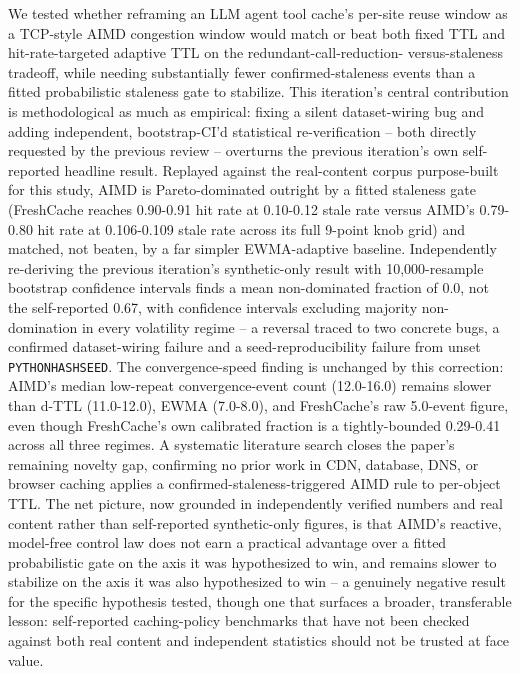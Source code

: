 \documentclass[11pt,letterpaper]{article}
\begin{document}
We tested whether reframing an LLM agent tool cache's per-site reuse window as a TCP-style AIMD congestion
window would match or beat both fixed TTL and hit-rate-targeted adaptive TTL on the redundant-call-reduction-
versus-staleness tradeoff, while needing substantially fewer confirmed-staleness events than a fitted
probabilistic staleness gate to stabilize. This iteration's central contribution is methodological as much
as empirical: fixing a silent dataset-wiring bug and adding independent, bootstrap-CI'd statistical
re-verification -- both directly requested by the previous review -- overturns the previous iteration's own
self-reported headline result. Replayed against the real-content corpus purpose-built for this study, AIMD
is Pareto-dominated outright by a fitted staleness gate (FreshCache reaches 0.90-0.91 hit rate at 0.10-0.12
stale rate versus AIMD's 0.79-0.80 hit rate at 0.106-0.109 stale rate across its full 9-point knob grid) and
matched, not beaten, by a far simpler EWMA-adaptive baseline. Independently re-deriving the previous
iteration's synthetic-only result with 10,000-resample bootstrap confidence intervals finds a mean
non-dominated fraction of 0.0, not the self-reported 0.67, with confidence intervals excluding majority
non-domination in every volatility regime -- a reversal traced to two concrete bugs, a confirmed
dataset-wiring failure and a seed-reproducibility failure from unset \texttt{PYTHONHASHSEED}. The convergence-speed
finding is unchanged by this correction: AIMD's median low-repeat convergence-event count (12.0-16.0)
remains slower than d-TTL (11.0-12.0), EWMA (7.0-8.0), and FreshCache's raw 5.0-event figure, even though
FreshCache's own calibrated fraction is a tightly-bounded 0.29-0.41 across all three regimes. A systematic
literature search closes the paper's remaining novelty gap, confirming no prior work in CDN, database,
DNS, or browser caching applies a confirmed-staleness-triggered AIMD rule to per-object TTL. The net
picture, now grounded in independently verified numbers and real content rather than self-reported
synthetic-only figures, is that AIMD's reactive, model-free control law does not earn a practical advantage
over a fitted probabilistic gate on the axis it was hypothesized to win, and remains slower to stabilize on
the axis it was also hypothesized to win -- a genuinely negative result for the specific hypothesis tested,
though one that surfaces a broader, transferable lesson: self-reported caching-policy benchmarks that have
not been checked against both real content and independent statistics should not be trusted at face value.
\end{document}
